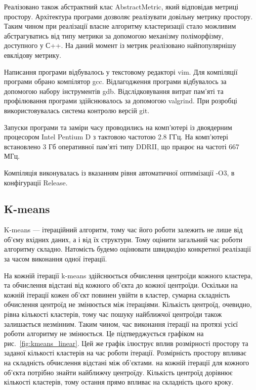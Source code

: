             Реалізовано також абстрактний клас AbstractMetric, який відповідав метриці простору. Архітектура програми дозволяє реалізувати довільну метрику простору. Таким чином при реалізації власне алгоритму кластеризації стало можливим абстрагуватись від типу метрики за допомогою механізму поліморфізму, доступного у С++. На даний момент із метрик реалізовано найпопулярнішу евклідову метрику.
            
            Написання програми відбувалось у текстовому редакторі vim. Для компіляції програми обрано компілятор gcc. Відлагодження програми відбувалось за допомогою набору інструментів gdb. Відслідковування витрат пам'яті та профілювання програми здійснювалось за допомогою valgrind. При розробці використовувалась система контролю версій git.
            
            Запуски програми та заміри часу проводились на комп’ютері із двоядерним процесором Intel Pentium D з тактовою частотою 2.8 ГГц. На комп’ютері встановлено 3 Гб оперативної пам’яті типу DDRII, що працює на частоті 667 МГц.
            
            Компіляція виконувалась із вказанням рівня автоматичної оптимізації -O3, в конфігурації Release.
            
            \subsection{K-means}
            
                K-means --- ітераційний алгоритм, тому час його роботи залежить не лише від об’єму вхідних даних, а і від їх структури. Тому оцінити загальний час роботи алгоритму складно. Натомість будемо оцінювати швидкодію конкретної реалізації за часом виконання одної ітерації. 
                
                На кожній ітерації k-means здійснюється обчислення центроїди кожного кластера, та обчислення відстані від кожного об’єкта до кожної центроїди. Оскільки на кожній ітерації кожен об’єкт повинен увійти в кластер, сумарна складність обчислення центроїд не змінюється між ітераціями. Кількість центроїд, очевидно, рівна кількості кластерів, тому час пошуку найближчої центроїди також залишається незмінним. Таким чином, час виконання ітерації на протязі усієї роботи алгоритму не змінюється. Це підтверджується графіком на рис.~\ref{fig:kmeans_linear}. Цей же графік ілюструє вплив розмірності простору та заданої кількості кластерів на час роботи ітерації. Розмірність простору впливає на складність обчислення відстані між об’єктами. на кожній ітерації для кожного об’єкта потрібно знайти найближчу центроїду. Кількість центроїд дорівнює кількості кластерів, тому остання прямо впливає на складність цього кроку.
                
